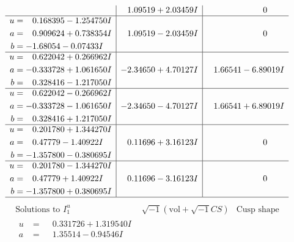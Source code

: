 \documentclass[1p]{elsarticle_modified}
\theoremstyle{definition}
\newcommand{\I}{\sqrt{-1}}
\begin{document}
$$\begin{array}{c|c|c}
 & \phantom{-}1.09519 + 2.03459 I & \phantom{-0.000000 } 0 \\ \hline\begin{aligned}
u &= \phantom{-}0.168395 - 1.254750 I \\
a &= \phantom{-}0.909624 + 0.738354 I \\
b &= -1.68054 - 0.07433 I\end{aligned}
 & \phantom{-}1.09519 - 2.03459 I & \phantom{-0.000000 } 0 \\ \hline\begin{aligned}
u &= \phantom{-}0.622042 + 0.266962 I \\
a &= -0.333728 + 1.061650 I \\
b &= \phantom{-}0.328416 - 1.217050 I\end{aligned}
 & -2.34650 + 4.70127 I & \phantom{-}1.66541 - 6.89019 I \\ \hline\begin{aligned}
u &= \phantom{-}0.622042 - 0.266962 I \\
a &= -0.333728 - 1.061650 I \\
b &= \phantom{-}0.328416 + 1.217050 I\end{aligned}
 & -2.34650 - 4.70127 I & \phantom{-}1.66541 + 6.89019 I \\ \hline\begin{aligned}
u &= \phantom{-}0.201780 + 1.344270 I \\
a &= \phantom{-}0.47779 - 1.40922 I \\
b &= -1.357800 - 0.380695 I\end{aligned}
 & \phantom{-}0.11696 + 3.16123 I & \phantom{-0.000000 } 0 \\ \hline\begin{aligned}
u &= \phantom{-}0.201780 - 1.344270 I \\
a &= \phantom{-}0.47779 + 1.40922 I \\
b &= -1.357800 + 0.380695 I\end{aligned}
 & \phantom{-}0.11696 - 3.16123 I & \phantom{-0.000000 } 0\\
 \hline 
 \end{array}$$\newpage$$\begin{array}{c|c|c}  
\text{Solutions to }I^u_{1}& \I (\text{vol} + \sqrt{-1}CS) & \text{Cusp shape}\\
 \hline 
\begin{aligned}
u &= \phantom{-}0.331726 + 1.319540 I \\
a &= \phantom{-}1.35514 - 0.94546 I \\

\end{aligned}
\end{array}$$
\end{document}
